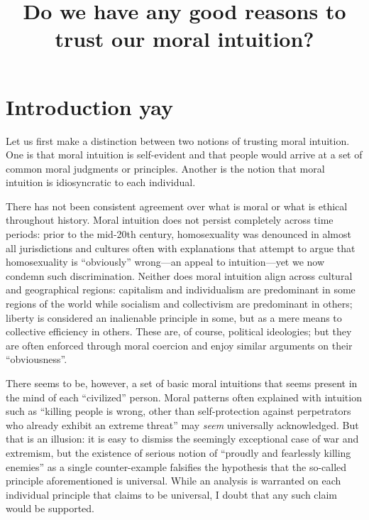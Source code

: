 \documentclass{scrartcl}
\title{Do we have any good reasons to trust our moral intuition?}
\author{}
\date{}
\begin{document}
\maketitle


\section{Introduction yay}

Let us first make a distinction between two notions of trusting moral intuition. One is that moral intuition is self-evident and that people would arrive at a set of common moral judgments or principles. Another is the notion that moral intuition is idiosyncratic to each individual.

There has not been consistent agreement over what is moral or what is ethical throughout history. Moral intuition does not persist completely across time periods: prior to the mid-20th century, homosexuality was denounced in almost all jurisdictions and cultures often with explanations that attempt to argue that homosexuality is ``obviously'' wrong---an appeal to intuition---yet we now condemn such discrimination. Neither does moral intuition align across cultural and geographical regions: capitalism and individualism are predominant in some regions of the world while socialism and collectivism are predominant in others; liberty is considered an inalienable principle in some, but as a mere means to collective efficiency in others. These are, of course, political ideologies; but they are often enforced through moral coercion and enjoy similar arguments on their ``obviousness''.

There seems to be, however, a set of basic moral intuitions that seems present in the mind of each ``civilized'' person. Moral patterns often explained with intuition such as ``killing people is wrong, other than self-protection against perpetrators who already exhibit an extreme threat'' may \emph{seem} universally acknowledged. But that is an illusion: it is easy to dismiss the seemingly exceptional case of war and extremism, but the existence of serious notion of ``proudly and fearlessly killing enemies'' as a single counter-example falsifies the hypothesis that the so-called principle aforementioned is universal. While an analysis is warranted on each individual principle that claims to be universal, I doubt that any such claim would be supported.%
\end{document}
